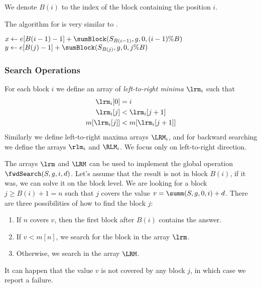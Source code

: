 \bigbreak

We denote $B(i)$ to the index of the block containing the position $i$.

The algorithm for \summ is very similar to \sumBlock.

\begin{algorithm}
\begin{algorithmic}
	\State $x \gets e[B(i - 1) - 1] + \sumBlock(S_{B(i - 1)}, g, 0, (i - 1) \% B)$
	\State $y \gets e[B(j) - 1] + \sumBlock(S_{B(j)}, g, 0, j \% B)$
	\State {}
\EndFunction
\end{algorithmic}
\end{algorithm}

\subsubsection{Search Operations}\label{ff-search}

For each block $i$ we define an array of \emph{left-to-right minima} $\lrm_i$ such that
\begin{align*}
	\lrm_i[0] &= i \\
	\lrm_i[j] &< \lrm_i[j+1] \\
	m[\lrm_i[j]] &< m[\lrm_i[j+1]]
\end{align*}
Similarly we define left-to-right maxima arrays $\LRM_i$, and for backward searching we define the arrays $\rlm_i$ and $\RLM_i$.
We focus only on left-to-right direction.

The arrays $\lrm$ and $\LRM$ can be used to implement the global operation $\fwdSearch(S, g, i, d)$.
Let's assume that the result is not in block $B(i)$, if it was, we can solve it on the block level.
We are looking for a block $j \ge B(i) + 1 = n$ such that $j$ covers the value $v = \summ(S, g, 0, i) + d$.
There are three possibilities of how to find the block $j$:
\begin{enumerate}
	\item If $n$ covers $v$, then the first block after $B(i)$ contains the answer.
	\item If $v < m[n]$, we search for the block in the array $\lrm$.
	\item Otherwise, we search in the array $\LRM$.
\end{enumerate}
It can happen that the value $v$ is not covered by any block $j$, in which case we report a failure.

